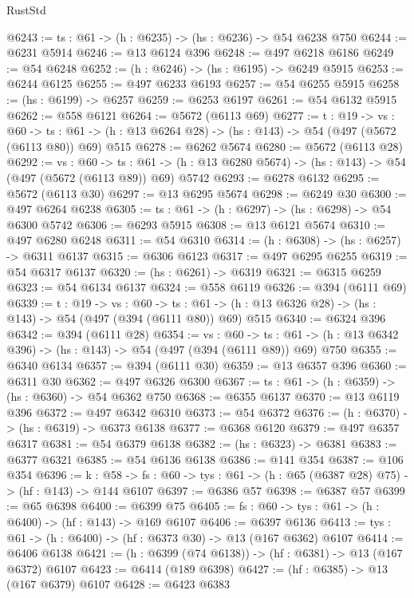\begin{lexlean}{RustStd}
\begin{coremodule}
@6243 := {ts : @61} -> (h : @6235) -> (hs : @6236) -> @54 @6238 @750
@6244 := @6231 @5914
@6246 := @13 @6124 @396
@6248 := @497 @6218 @6186
@6249 := @54 @6248
@6252 := (h : @6246) -> (hs : @6195) -> @6249 @5915
@6253 := @6244 @6125
@6255 := @497 @6233 @6193
@6257 := @54 @6255 @5915
@6258 := (hs : @6199) -> @6257
@6259 := @6253 @6197
@6261 := @54 @6132 @5915
@6262 := @558 @6121
@6264 := @5672 (@6113 @69)
@6277 := {t : @19} ->
  {vs : @60} ->
  {ts : @61} -> (h : @13 @6264 @28) -> (hs : @143) -> @54 (@497 (@5672 (@6113 @80)) @69) @515
@6278 := @6262 @5674
@6280 := @5672 (@6113 @28)
@6292 := {vs : @60} ->
  {ts : @61} -> (h : @13 @6280 @5674) -> (hs : @143) -> @54 (@497 (@5672 (@6113 @89)) @69) @5742
@6293 := @6278 @6132
@6295 := @5672 (@6113 @30)
@6297 := @13 @6295 @5674
@6298 := @6249 @30
@6300 := @497 @6264 @6238
@6305 := {ts : @61} -> (h : @6297) -> (hs : @6298) -> @54 @6300 @5742
@6306 := @6293 @5915
@6308 := @13 @6121 @5674
@6310 := @497 @6280 @6248
@6311 := @54 @6310
@6314 := (h : @6308) -> (hs : @6257) -> @6311 @6137
@6315 := @6306 @6123
@6317 := @497 @6295 @6255
@6319 := @54 @6317 @6137
@6320 := (hs : @6261) -> @6319
@6321 := @6315 @6259
@6323 := @54 @6134 @6137
@6324 := @558 @6119
@6326 := @394 (@6111 @69)
@6339 := {t : @19} ->
  {vs : @60} ->
  {ts : @61} -> (h : @13 @6326 @28) -> (hs : @143) -> @54 (@497 (@394 (@6111 @80)) @69) @515
@6340 := @6324 @396
@6342 := @394 (@6111 @28)
@6354 := {vs : @60} ->
  {ts : @61} -> (h : @13 @6342 @396) -> (hs : @143) -> @54 (@497 (@394 (@6111 @89)) @69) @750
@6355 := @6340 @6134
@6357 := @394 (@6111 @30)
@6359 := @13 @6357 @396
@6360 := @6311 @30
@6362 := @497 @6326 @6300
@6367 := {ts : @61} -> (h : @6359) -> (hs : @6360) -> @54 @6362 @750
@6368 := @6355 @6137
@6370 := @13 @6119 @396
@6372 := @497 @6342 @6310
@6373 := @54 @6372
@6376 := (h : @6370) -> (hs : @6319) -> @6373 @6138
@6377 := @6368 @6120
@6379 := @497 @6357 @6317
@6381 := @54 @6379 @6138
@6382 := (hs : @6323) -> @6381
@6383 := @6377 @6321
@6385 := @54 @6136 @6138
@6386 := @141 @354
@6387 := @106 @354
@6396 := {k : @58} ->
  {fs : @60} -> {tys : @61} -> (h : @65 (@6387 @28) @75) -> (hf : @143) -> @144 @6107
@6397 := @6386 @57
@6398 := @6387 @57
@6399 := @65 @6398
@6400 := @6399 @75
@6405 := {fs : @60} -> {tys : @61} -> (h : @6400) -> (hf : @143) -> @169 @6107
@6406 := @6397 @6136
@6413 := {tys : @61} -> (h : @6400) -> (hf : @6373 @30) -> @13 (@167 @6362) @6107
@6414 := @6406 @6138
@6421 := (h : @6399 (@74 @6138)) -> (hf : @6381) -> @13 (@167 @6372) @6107
@6423 := @6414 (@189 @6398)
@6427 := (hf : @6385) -> @13 (@167 @6379) @6107
@6428 := @6423 @6383

\end{coremodule}
\end{lexlean}
